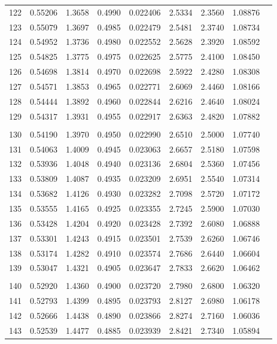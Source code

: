 \documentclass[letter,twosides,10pt]{article}
\begin{document}
\begin{longtable}{|c|c|c|c|c|c|c|c|c|}
122 & 0.55206 & 1.3658 & 0.4990 & 0.022406 & 2.5334 &  2.3560 & 1.08876 \\
123 & 0.55079 & 1.3697 & 0.4985 & 0.022479 & 2.5481 &  2.3740 & 1.08734 \\
124 & 0.54952 & 1.3736 & 0.4980 & 0.022552 & 2.5628 &  2.3920 & 1.08592 \\
125 & 0.54825 & 1.3775 & 0.4975 & 0.022625 & 2.5775 &  2.4100 & 1.08450 \\
126 & 0.54698 & 1.3814 & 0.4970 & 0.022698 & 2.5922 &  2.4280 & 1.08308 \\
127 & 0.54571 & 1.3853 & 0.4965 & 0.022771 & 2.6069 &  2.4460 & 1.08166 \\
128 & 0.54444 & 1.3892 & 0.4960 & 0.022844 & 2.6216 &  2.4640 & 1.08024 \\
129 & 0.54317 & 1.3931 & 0.4955 & 0.022917 & 2.6363 &  2.4820 & 1.07882 \\
 & & & & & & & \\
130 & 0.54190 & 1.3970 & 0.4950 & 0.022990 & 2.6510 &  2.5000 & 1.07740 \\
131 & 0.54063 & 1.4009 & 0.4945 & 0.023063 & 2.6657 &  2.5180 & 1.07598 \\
132 & 0.53936 & 1.4048 & 0.4940 & 0.023136 & 2.6804 &  2.5360 & 1.07456 \\
133 & 0.53809 & 1.4087 & 0.4935 & 0.023209 & 2.6951 &  2.5540 & 1.07314 \\
134 & 0.53682 & 1.4126 & 0.4930 & 0.023282 & 2.7098 &  2.5720 & 1.07172 \\
135 & 0.53555 & 1.4165 & 0.4925 & 0.023355 & 2.7245 &  2.5900 & 1.07030 \\
136 & 0.53428 & 1.4204 & 0.4920 & 0.023428 & 2.7392 &  2.6080 & 1.06888 \\
137 & 0.53301 & 1.4243 & 0.4915 & 0.023501 & 2.7539 &  2.6260 & 1.06746 \\
138 & 0.53174 & 1.4282 & 0.4910 & 0.023574 & 2.7686 &  2.6440 & 1.06604 \\
139 & 0.53047 & 1.4321 & 0.4905 & 0.023647 & 2.7833 &  2.6620 & 1.06462 \\
 & & & & & & & \\
140 & 0.52920 & 1.4360 & 0.4900 & 0.023720 & 2.7980 &  2.6800 & 1.06320 \\
141 & 0.52793 & 1.4399 & 0.4895 & 0.023793 & 2.8127 &  2.6980 & 1.06178 \\
142 & 0.52666 & 1.4438 & 0.4890 & 0.023866 & 2.8274 &  2.7160 & 1.06036 \\
143 & 0.52539 & 1.4477 & 0.4885 & 0.023939 & 2.8421 &  2.7340 & 1.05894 \\

\end{longtable}
\end{document}
